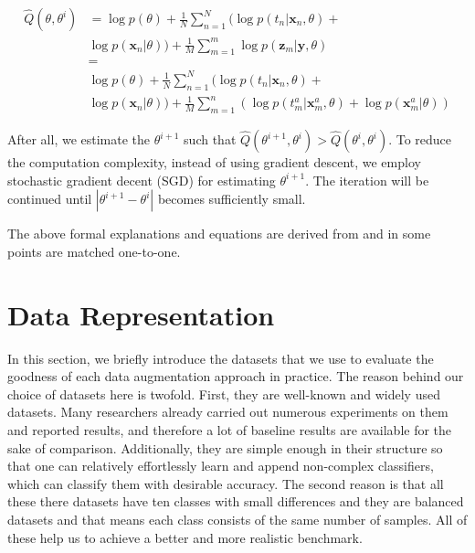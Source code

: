 \begin{equation}
  \begin{split}
    \hat{Q}(\theta, \theta^{i}) &= \log p(\theta)+\frac{1}{N} \sum_{n=1}^{N}(\log p(t_{n} | \mathbf{x}_{n}, \theta)+ \\
    & \log p(\mathbf{x}_{n} | \theta))+\frac{1}{M} \sum_{m=1}^{m} \log p(\mathbf{z}_{m} | \mathbf{y}, \theta) \\
    &= \\
    & \log p(\theta)+\frac{1}{N} \sum_{n=1}^{N}(\log p(t_{n} | \mathbf{x}_{n}, \theta)+\\
    & \log p(\mathbf{x}_{n} | \theta))+ \frac{1}{M} \sum_{m=1}^{n}(\log p(t_{m}^{a} | \mathbf{x}_{m}^{a}, \theta)+\log p(\mathbf{x}_{m}^{a} | \theta))
  \end{split}
\end{equation}

After all, we estimate the $\theta^{i +1}$ such that $\hat{Q}(\theta^{i +1}, \theta^{i}) >
  \hat{Q}(\theta^{i}, \theta^{i})$. To reduce the computation complexity, instead of using
gradient descent, we employ stochastic gradient decent (SGD) for estimating $\theta^{i +1}$. The
iteration will be continued until $|\theta^{i +1} - \theta^{i}|$ becomes sufficiently small.

The above formal explanations and equations are derived from \cite{refrence_bayesian_approach} and in some points are matched one-to-one.

\chapter{Data Representation}
\label{tit:data-representation}
In this section, we briefly introduce the datasets that we use to evaluate the goodness of each data
augmentation approach in practice. The reason behind our choice of datasets here is twofold. First,
they are well-known and widely used datasets. Many researchers already carried out numerous
experiments on them and reported results, and therefore a lot of baseline results are available for
the sake of comparison. Additionally, they are simple enough in their structure so that one can
relatively effortlessly learn and append non-complex classifiers, which can classify them with
desirable accuracy. The second reason is that all these there datasets have ten classes with small
differences and they are balanced datasets and that means each class consists of the same number of
samples. All of these help us to achieve a better and more realistic benchmark.

